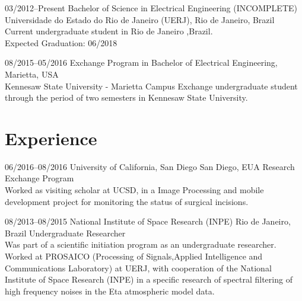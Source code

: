 \documentclass[]{friggeri-cv} %
\begin{document}
\begin{entrylist}


\entry
{03/2012--Present}
{\hspace{.25cm} Bachelor of Science in Electrical Engineering (INCOMPLETE)}
{\\Universidade do Estado do Rio de Janeiro (UERJ), Rio de Janeiro, Brazil}
{Current undergraduate student in Rio de Janeiro ,Brazil. \\ Expected Graduation: 06/2018 \\ \color{red}{CR = 7.8/10} }


\entry
{08/2015--05/2016}
{\hspace{.25cm} Exchange Program in Bachelor of Electrical Engineering, Marietta, USA}
{\\Kennesaw State University - Marietta Campus}
{Exchange undergraduate student through the period of two semesters in Kennesaw State University.  \\
\color{red}{GPA = 3.9/4.0} }


\end{entrylist}


\section{Experience}

\begin{entrylist}


\entry
{06/2016--08/2016}
{\hspace{.15cm} University of California, San Diego}
{San Diego, EUA}
{Research Exchange Program \\
Worked as visiting scholar at UCSD, in a Image Processing and mobile development project for monitoring the status of surgical incisions.}


\entry
{08/2013--08/2015}
{\hspace{.15cm}National Institute of Space Research (INPE)}
{Rio de Janeiro, Brazil}
{Undergraduate Researcher \\
Was part of a scientific initiation program as an undergraduate researcher. Worked at PROSAICO (Processing of Signals,Applied Intelligence and Communications Laboratory) at UERJ, with cooperation of the National Institute of Space Research (INPE) in a specific research of spectral filtering of high frequency noises in the Eta atmospheric model data.}

\end{entrylist}
\end{document}
